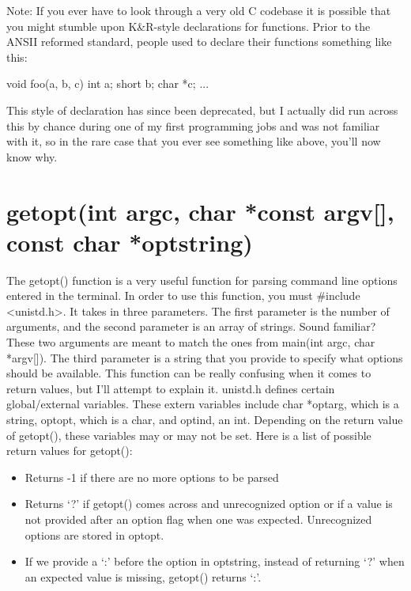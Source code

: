 \documentclass{article}
\begin{document}
Note: If you ever have to look through a very old C codebase it is possible that you might stumble upon
K&R-style declarations for functions. Prior to the ANSII reformed standard, people used to declare their
functions something like this:

\begin{cblk}
void foo(a, b, c)
    int a;
    short b;
    char *c;
{
    ...
}
\end{cblk}

This style of declaration has since been deprecated, but I actually did run across this by chance during one
of my first programming jobs and was not familiar with it, so in the rare case that you ever see something
like above, you’ll now know why.

\section{getopt(int argc, char *const argv[], const char *optstring)}

The getopt() function is a very useful function for parsing command line options entered in the terminal. In
order to use this function, you must #include <unistd.h>. It takes in three parameters. The first parameter
is the number of arguments, and the second parameter is an array of strings. Sound familiar? These two
arguments are meant to match the ones from main(int argc, char *argv[]). The third parameter is a string that
you provide to specify what options should be available. This function can be really confusing when it comes
to return values, but I’ll attempt to explain it. unistd.h defines certain global/external variables. These
extern variables include char *optarg, which is a string, optopt, which is a char, and optind, an int.
Depending on the return value of getopt(), these variables may or may not be set. Here is a list of possible
return values for getopt():

\begin{itemize}

\item{%
    Returns -1 if there are no more options to be parsed
}

\item{%
    Returns ‘?’ if getopt() comes across and unrecognized option or if a value is not provided after an
    option flag when one was expected. Unrecognized options are stored in optopt.
}

\item{%
    If we provide a ‘:’ before the option in optstring, instead of returning ‘?’ when an expected value is
    missing, getopt() returns ‘:’.
}

\end{itemize}
\end{document}
